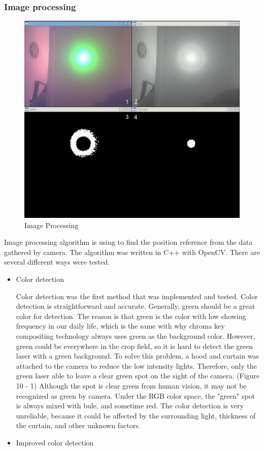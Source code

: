 \documentclass[12pt]{article}
\begin{document}
\begin{flushleft}
\subsubsection{Image processing}
\begin{figure}[ht!]
	\begin{center}
		\includegraphics[scale = 0.7]{imaging.jpg}
		\caption{Image Processing}
	\end{center}
\end{figure}
Image processing algorithm is using to find the position reference from the data gathered by camera. The algorithm was written in C++ with OpenCV. There are several different ways were tested.

\begin{itemize}
	\item Color detection
	
	Color detection was the first method that was implemented and tested. Color detection is straightforward and accurate. Generally, green should be a great color for detection. The reason is that green is the color with low showing frequency in our daily life, which is the same with why chroma key compositing technology always uses green as the background color. However, green could be everywhere in the crop field, so it is hard to detect the green laser with a green background. To solve this problem, a hood and curtain was attached to the camera to reduce the low intensity lights. Therefore, only the green laser able to leave a clear green spot on the sight of the camera. (Figure 10 - 1) Although the spot is clear green from human vision, it may not be recognized as green by camera. Under the RGB color space, the "green" spot is always mixed with bule, and sometime red. The color detection is very unreliable, because it could be affected by the surrounding light, thickness of the curtain, and other unknown factors.
	\item Improved color detection
	

\end{itemize}
\end{flushleft}
\end{document}
